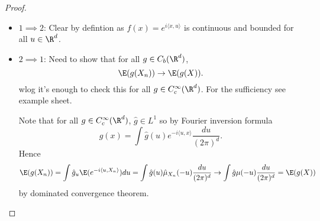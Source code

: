 \documentclass[a4paper]{article}
\begin{document}
\begin{proof}\leavevmode
  \begin{itemize}
  \item \(1 \implies 2\): Clear by defintion as \(f(x) = e^{i \langle x, u \rangle}\) is continuous and bounded for all \(u \in \R^d\).
  \item \(2 \implies 1\): Need to show that for all \(g \in C_b(\R^d)\),
    \[
      \E(g(X_n)) \to \E(g(X)).
    \]
    wlog it's enough to check this for all \(g \in C_c^\infty(\R^d)\). For the sufficiency see example sheet.

    Note that for all \(g \in C_c^\infty(\R^d)\), \(\hat g \in L^1\) so by Fourier inversion formula
    \[
      g(x) = \int \hat g(u) e^{-i \langle u, x\rangle} \frac{du}{(2\pi)^d}.
    \]
    Hence
    \[
      \E(g(X_n))
      = \int \hat g_u \E(e^{-i \langle u, X_n \rangle}) du
      = \int \hat g(u) \hat \mu_{X_n} (-u) \frac{du}{(2\pi)^d}
      \to \int \hat g \mu(-u) \frac{du}{(2\pi)^d}
      = \E(g(X))
    \]
    by dominated convergence theorem.
  \end{itemize}
\end{proof}












\printindex
\end{document}
